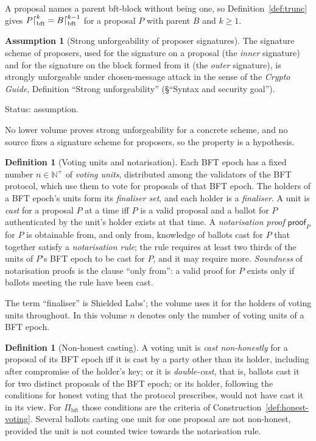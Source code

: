 \documentclass[11pt,a4paper]{article}
\theoremstyle{definition}
\newtheorem{definition}[theorem]{Definition}
\newtheorem{assumption}[theorem]{Assumption}
\newcommand{\N}{\mathbb{N}}
\newcommand{\bft}{\mathrm{bft}}
\newcommand{\Pibft}{\Pi_{\bft}}
\newcommand{\proofsym}{\mathsf{proof}}
\begin{document}
A proposal names a parent bft-block without being one, so
Definition~\ref{def:trunc} gives $P\trunc[\bft]{k} = B\trunc[\bft]{k-1}$ for
a proposal $P$ with parent $B$ and $k \ge 1$.

\begin{assumption}[Strong unforgeability of proposer signatures]
\label{ass:suf-cma}
The signature scheme of proposers, used for the signature on a proposal (the
\emph{inner} signature) and for the signature on the block formed from it
(the \emph{outer} signature), is strongly unforgeable under chosen-message
attack in the sense of the \emph{Crypto Guide}, Definition ``Strong
unforgeability'' (\S``Syntax and security goal'').

Status: assumption.
\end{assumption}

No lower volume proves strong unforgeability for a concrete scheme, and no
source fixes a signature scheme for proposers, so the property is a
hypothesis.

\begin{definition}[Voting units and notarisation]\label{def:units}
Each BFT epoch has a fixed number $n \in \N^{+}$ of \emph{voting units},
distributed among the validators of the BFT protocol, which use them to vote
for proposals of that BFT epoch. The holders of a BFT epoch's units form its
\emph{finaliser set}, and each holder is a \emph{finaliser}. A unit is
\emph{cast} for a proposal $P$ at a time iff $P$ is a valid proposal and a
ballot for $P$ authenticated by the unit's holder exists at that time. A
\emph{notarisation proof} $\proofsym_P$ for $P$ is obtainable from, and only
from, knowledge of ballots cast for $P$ that together satisfy a
\emph{notarisation rule}; the rule requires at least two thirds of the units
of $P$'s BFT epoch to be cast for $P$, and it may require more.
\emph{Soundness} of notarisation proofs is the clause ``only from'': a valid
proof for $P$ exists only if ballots meeting the rule have been cast.
\end{definition}

The term ``finaliser'' is Shielded Labs'; the volume uses it for the holders
of voting units throughout. In this volume $n$ denotes only the number of
voting units of a BFT epoch.

\begin{definition}[Non-honest casting]\label{def:nonhonest}
A voting unit is \emph{cast non-honestly} for a proposal of its BFT epoch
iff it is cast by a party other than its holder, including after compromise
of the holder's key; or it is \emph{double-cast}, that is, ballots cast it
for two distinct proposals of the BFT epoch; or its holder, following the
conditions for honest voting that the protocol prescribes, would not have
cast it in its view. For $\Pibft$ those conditions are the criteria of
Construction~\ref{def:honest-voting}. Several ballots casting one unit for
one proposal are not non-honest, provided the unit is not counted twice
towards the notarisation rule.
\end{definition}
\end{document}
